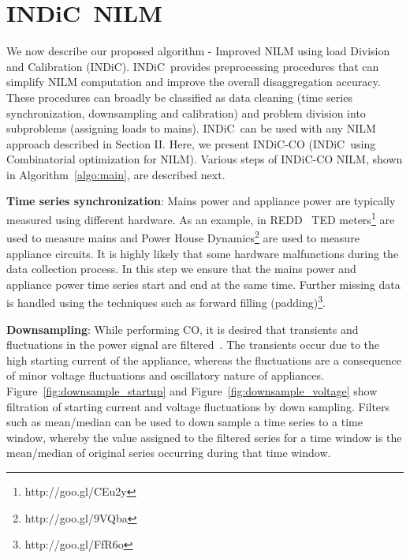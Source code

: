 \documentclass[conference]{IEEEtran}
\newcommand{\figref}[1]{Figure~\ref{#1}}
\newcommand{\algoref}[1]{Algorithm~\ref{#1}}
\newcommand{\indic}{INDiC~}
\newcommand{\indicns}{INDiC}
\begin{document}
\vspace{-2mm}
\section{\indic NILM}
\vspace{-1mm}
\noindent We now describe our proposed algorithm - Improved NILM using load Division and Calibration (\indicns). \indic provides preprocessing procedures that can simplify NILM computation and improve the overall disaggregation accuracy. These procedures can broadly be classified as data cleaning (time series synchronization, downsampling and calibration) and problem division into subproblems (assigning loads to mains). \indic can be used with any NILM approach described in Section II. Here, we present \indicns-CO (\indic using Combinatorial optimization for NILM). %
Various steps of \indicns-CO NILM, shown in \algoref{algo:main}, are described next. 

\noindent\textbf{Time series synchronization}: Mains power and appliance power are typically measured using different hardware. As an example, in REDD~\cite{redd} TED meters\footnote{http://goo.gl/CEu2y} are used to measure mains and Power House Dynamics\footnote{http://goo.gl/9VQba} are used to measure appliance circuits. It is highly likely that some hardware malfunctions during the data collection process. In this step we ensure that the mains power and appliance power time series start and end at the same time. Further missing data is handled using the techniques such as forward filling (padding)\footnote{http://goo.gl/FfR6o}.

\noindent\textbf{Downsampling}: While performing CO, it is desired that transients and fluctuations in the power signal are filtered~\cite{hart}. The transients occur due to the high starting current of the appliance, whereas the fluctuations are a consequence of minor voltage fluctuations and oscillatory nature of appliances. \figref{fig:downsample_startup} and \figref{fig:downsample_voltage} show filtration of starting current and voltage fluctuations by down sampling. Filters such as mean/median can be used to down sample a time series to a time window, whereby the value assigned to the filtered series for a time window is the mean/median of original series occurring during that time window. 
\end{document}

